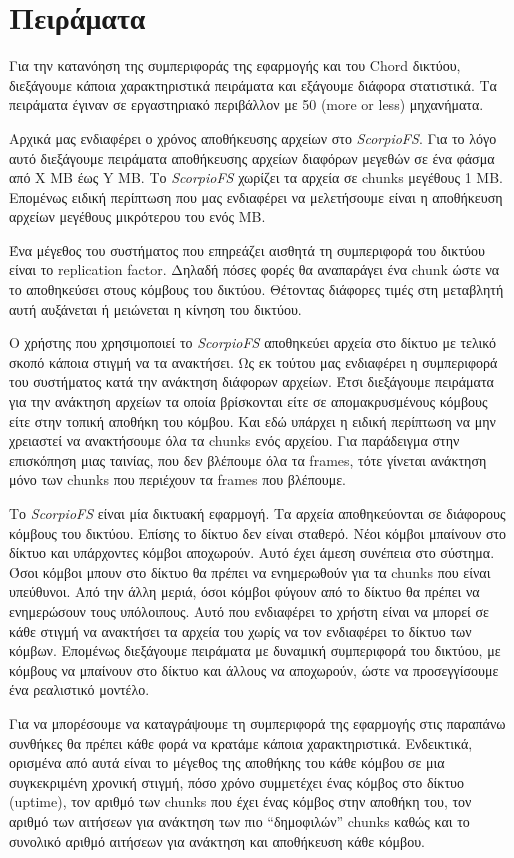 \documentclass[a4paper]{article}
\begin{document}
\section{Πειράματα}
Για την κατανόηση της συμπεριφοράς της εφαρμογής και του Chord δικτύου,
διεξάγουμε κάποια χαρακτηριστικά πειράματα και εξάγουμε διάφορα στατιστικά. Τα
πειράματα έγιναν σε εργαστηριακό περιβάλλον με 50 (more or less) μηχανήματα.

Αρχικά μας ενδιαφέρει ο χρόνος αποθήκευσης αρχείων στο \emph{ScorpioFS}. Για το
λόγο αυτό διεξάγουμε πειράματα αποθήκευσης αρχείων διαφόρων μεγεθών σε ένα φάσμα
από Χ MB έως Y MB. Το \emph{ScorpioFS} χωρίζει τα αρχεία σε chunks μεγέθους 1
MB. Επομένως ειδική περίπτωση που μας ενδιαφέρει να μελετήσουμε είναι η
αποθήκευση αρχείων μεγέθους μικρότερου του ενός MB.

Ένα μέγεθος του συστήματος που επηρεάζει αισθητά τη συμπεριφορά του δικτύου
είναι το replication factor. Δηλαδή πόσες φορές θα αναπαράγει ένα chunk ώστε να
το αποθηκεύσει στους κόμβους του δικτύου. Θέτοντας διάφορες τιμές στη μεταβλητή
αυτή αυξάνεται ή μειώνεται η κίνηση του δικτύου.

Ο χρήστης που χρησιμοποιεί το \emph{ScorpioFS} αποθηκεύει αρχεία στο δίκτυο με
τελικό σκοπό κάποια στιγμή να τα ανακτήσει. Ως εκ τούτου μας ενδιαφέρει η
συμπεριφορά του συστήματος κατά την ανάκτηση διάφορων αρχείων. Έτσι διεξάγουμε
πειράματα για την ανάκτηση αρχείων τα οποία βρίσκονται είτε σε απομακρυσμένους
κόμβους είτε στην τοπική αποθήκη του κόμβου. Και εδώ υπάρχει η ειδική περίπτωση
να μην χρειαστεί να ανακτήσουμε όλα τα chunks ενός αρχείου. Για παράδειγμα στην
επισκόπηση μιας ταινίας, που δεν βλέπουμε όλα τα frames, τότε γίνεται ανάκτηση
μόνο των chunks που περιέχουν τα frames που βλέπουμε.

Το \emph{ScorpioFS} είναι μία δικτυακή εφαρμογή. Τα αρχεία αποθηκεύονται σε
διάφορους κόμβους του δικτύου. Επίσης το δίκτυο δεν είναι σταθερό. Νέοι κόμβοι
μπαίνουν στο δίκτυο και υπάρχοντες κόμβοι αποχωρούν. Αυτό έχει άμεση συνέπεια
στο σύστημα. Όσοι κόμβοι μπουν στο δίκτυο θα πρέπει να ενημερωθούν για τα chunks
που είναι υπεύθυνοι. Από την άλλη μεριά, όσοι κόμβοι φύγουν από το δίκτυο θα
πρέπει να ενημερώσουν τους υπόλοιπους. Αυτό που ενδιαφέρει το χρήστη είναι να
μπορεί σε κάθε στιγμή να ανακτήσει τα αρχεία του χωρίς να τον ενδιαφέρει το
δίκτυο των κόμβων. Επομένως διεξάγουμε πειράματα με δυναμική συμπεριφορά του
δικτύου, με κόμβους να μπαίνουν στο δίκτυο και άλλους να αποχωρούν, ώστε να
προσεγγίσουμε ένα ρεαλιστικό μοντέλο.

Για να μπορέσουμε να καταγράψουμε τη συμπεριφορά της εφαρμογής στις παραπάνω
συνθήκες θα πρέπει κάθε φορά να κρατάμε κάποια χαρακτηριστικά. Ενδεικτικά,
ορισμένα από αυτά είναι το μέγεθος της αποθήκης του κάθε κόμβου σε μια
συγκεκριμένη χρονική στιγμή, πόσο χρόνο συμμετέχει ένας κόμβος στο δίκτυο
(uptime), τον αριθμό των chunks που έχει ένας κόμβος στην αποθήκη του, τον
αριθμό των αιτήσεων για ανάκτηση των πιο ``δημοφιλών'' chunks καθώς και το
συνολικό αριθμό αιτήσεων για ανάκτηση και αποθήκευση κάθε κόμβου.
\end{document}
